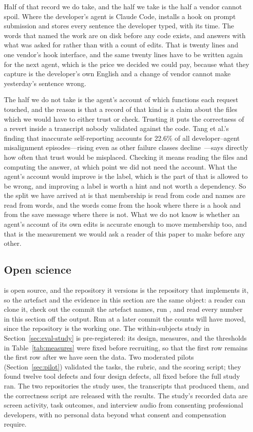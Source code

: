 Half of that record we do take, and the half we take is the half a vendor cannot
spoil. Where the developer's agent is Claude Code, \sgt{} installs a hook on
prompt submission and stores every sentence the developer typed, with its time.
The words that named the work are on disk before any code exists, and 
answers with what was asked for rather than with a count of edits. That is twenty
lines and one vendor's hook interface, and the same twenty lines have to be
written again for the next agent, which is the price we decided we could pay,
because what they capture is the developer's own English and a change of vendor
cannot make yesterday's sentence wrong.

The half we do not take is the agent's account of which functions each request
touched, and the reason is that a record of that kind is a claim about the files
which we would have to either trust or check. Trusting it puts the correctness of
a revert inside a transcript nobody validated against the code. Tang et
al.'s finding that inaccurate self-reporting accounts for 22.6\% of all
developer--agent misalignment episodes---rising even as other failure classes
decline~\cite{tang2026agentfailures}---says directly how often that trust would
be misplaced. Checking it means
reading the files and computing the answer, at which point we did not need the
account. What the agent's account would improve is the label, which is the part of
\sgt{} that is allowed to be wrong, and improving a label is worth a hint and not
worth a dependency. So the split we have arrived at is that membership is read
from code and names are read from words, and the words come from the hook where
there is a hook and from the save message where there is not. What we do not know
is whether an agent's account of its own edits is accurate enough to move
membership too, and that is the measurement we would ask a reader of this paper to
make before any other.

\subsection*{Open science}

\sgt{} is open source, and the repository it versions is the repository that
implements it, so the artefact and the evidence in this section are the same
object: a reader can clone it, check out the commit the artefact names, run
, and read every number in this section off the output. Run
at a later commit the counts will have moved, since the repository is the working
one. The within-subjects study in Section~\ref{sec:eval-study} is pre-registered: its
design, measures, and the thresholds in Table~\ref{tab:measures} were fixed before
recruiting, so that the first row remains the first row after we have seen the
data. Two moderated pilots (Section~\ref{sec:pilot}) validated the tasks, the
rubric, and the scoring script; they found twelve tool defects and four design
defects, all fixed before the full study ran. The two repositories the study
uses, the transcripts that produced them, and the correctness script are
released with the results. The study's recorded data are screen activity,
task outcomes, and interview audio from consenting professional developers, with no
personal data beyond what consent and compensation require.
